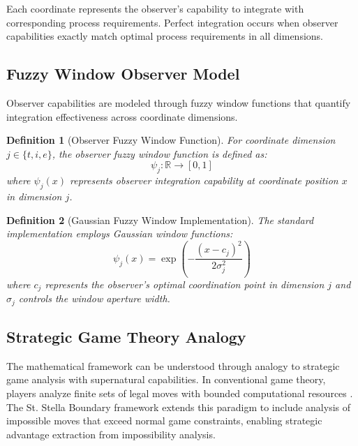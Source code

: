 \documentclass[12pt,a4paper]{article}
\newtheorem{definition}{Definition}
\begin{document}
Each coordinate represents the observer's capability to integrate with corresponding process requirements. Perfect integration occurs when observer capabilities exactly match optimal process requirements in all dimensions.

\subsection{Fuzzy Window Observer Model}

Observer capabilities are modeled through fuzzy window functions that quantify integration effectiveness across coordinate dimensions.

\begin{definition}[Observer Fuzzy Window Function]
For coordinate dimension $j \in \{t, i, e\}$, the observer fuzzy window function is defined as:
\begin{equation}
\psi_j: \mathbb{R} \to [0,1]
\end{equation}
where $\psi_j(x)$ represents observer integration capability at coordinate position $x$ in dimension $j$.
\end{definition}

\begin{definition}[Gaussian Fuzzy Window Implementation]
The standard implementation employs Gaussian window functions:
\begin{equation}
\psi_j(x) = \exp\left(-\frac{(x - c_j)^2}{2\sigma_j^2}\right)
\end{equation}
where $c_j$ represents the observer's optimal coordination point in dimension $j$ and $\sigma_j$ controls the window aperture width.
\end{definition}

\subsection{Strategic Game Theory Analogy}

The mathematical framework can be understood through analogy to strategic game analysis with supernatural capabilities. In conventional game theory, players analyze finite sets of legal moves with bounded computational resources \cite{neumann1944theory}. The St. Stella Boundary framework extends this paradigm to include analysis of impossible moves that exceed normal game constraints, enabling strategic advantage extraction from impossibility analysis.
\end{document}
